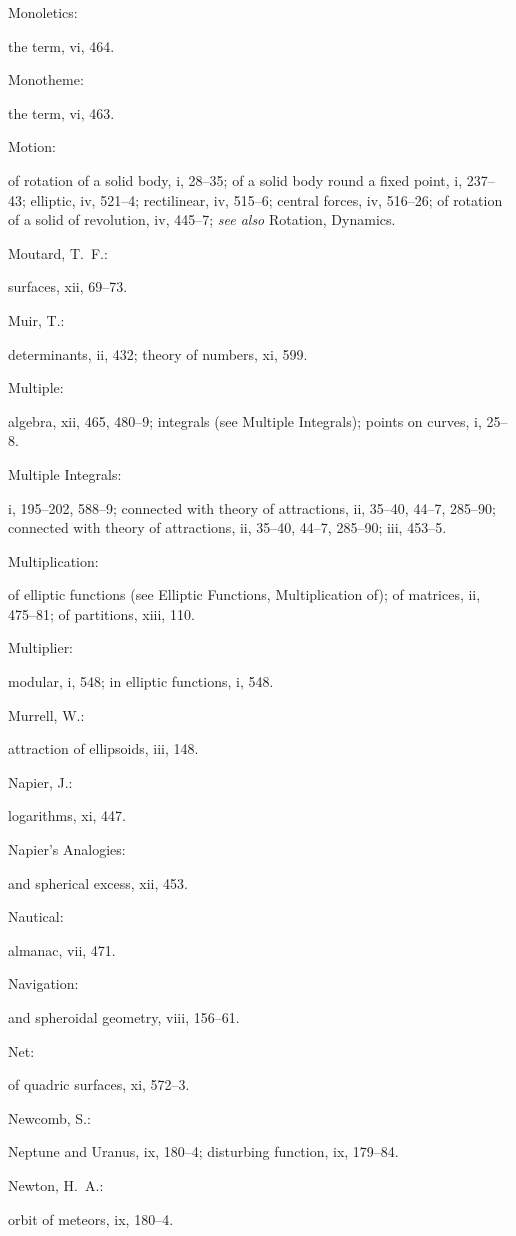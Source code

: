 \documentclass[11pt,a4paper]{book}
\providecommand{\V}[1]{#1}
\providecommand{\IndexEntry}[2]{#1\dotfill #2\par}
\begin{document}
\IndexEntry{Monoletics}: the term, \V{vi}, 464.

\IndexEntry{Monotheme}: the term, \V{vi}, 463.

\IndexEntry{Motion}: of rotation of a solid body, \V{i}, 28--35; of a solid body round a fixed point, \V{i}, 237--43; elliptic, \V{iv}, 521--4; rectilinear, \V{iv}, 515--6; central forces, \V{iv}, 516--26; of rotation of a solid of revolution, \V{iv}, 445--7; \textit{see also} Rotation, Dynamics.

\IndexEntry{Moutard, T.\ F.}: surfaces, \V{xii}, 69--73.

\IndexEntry{Muir, T.}: determinants, \V{ii}, 432; theory of numbers, \V{xi}, 599.

\IndexEntry{Multiple}: algebra, \V{xii}, 465, 480--9; integrals (see Multiple Integrals); points on curves, \V{i}, 25--8.

\IndexEntry{Multiple Integrals}: \V{i}, 195--202, 588--9; connected with theory of attractions, \V{ii}, 35--40, 44--7, 285--90; connected with theory of attractions, \V{ii}, 35--40, 44--7, 285--90; \V{iii}, 453--5.

\IndexEntry{Multiplication}: of elliptic functions (see Elliptic Functions, Multiplication of); of matrices, \V{ii}, 475--81; of partitions, \V{xiii}, 110.

\newpage

\setcounter{page}{113}

\IndexEntry{Multiplier}: modular, \V{i}, 548; in elliptic functions, \V{i}, 548.

\IndexEntry{Murrell, W.}: attraction of ellipsoids, \V{iii}, 148.

\IndexEntry{Napier, J.}: logarithms, \V{xi}, 447.

\IndexEntry{Napier's Analogies}: and spherical excess, \V{xii}, 453.

\IndexEntry{Nautical}: almanac, \V{vii}, 471.

\IndexEntry{Navigation}: and spheroidal geometry, \V{viii}, 156--61.

\IndexEntry{Net}: of quadric surfaces, \V{xi}, 572--3.

\IndexEntry{Newcomb, S.}: Neptune and Uranus, \V{ix}, 180--4; disturbing function, \V{ix}, 179--84.

\IndexEntry{Newton, H.\ A.}: orbit of meteors, \V{ix}, 180--4.
\end{document}
